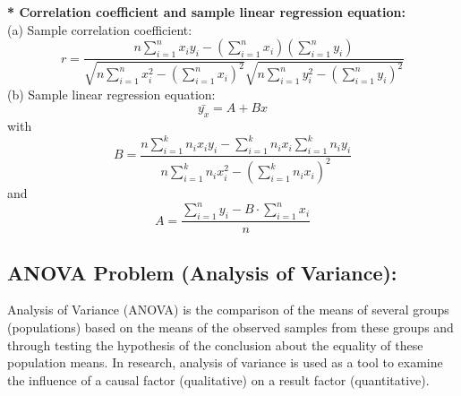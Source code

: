 \documentclass{article}
\begin{document}
	\textbf{* Correlation coefficient and sample linear regression equation:}\\
	(a) Sample correlation coefficient:
	\[
	r = \frac{n \sum_{i=1}^{n} x_i y_i - \left(\sum_{i=1}^{n} x_i\right)\left(\sum_{i=1}^{n} y_i\right)}
	{\sqrt{n \sum_{i=1}^{n} x_i^2 - \left(\sum_{i=1}^{n} x_i\right)^2} \sqrt{n \sum_{i=1}^{n} y_i^2 - \left(\sum_{i=1}^{n} y_i\right)^2}}
	\]
	(b) Sample linear regression equation: \[
	\bar{y_x} = A + Bx
	\]
	with \[
	B = \frac{n \sum_{i=1}^{k} n_i x_i y_i - \sum_{i=1}^{k} n_i x_i \sum_{i=1}^{k} n_i y_i}{n \sum_{i=1}^{k} n_i x_i^2 - \left( \sum_{i=1}^{k} n_i x_i \right)^2}
	\]
	and \[
	A = \frac{\sum_{i=1}^{n} y_i - B \cdot \sum_{i=1}^{n} x_i}{n}
	\]
	\subsection{ANOVA Problem (Analysis of Variance):}
	Analysis of Variance (ANOVA) is the comparison of the means of several groups (populations) based on the means of the observed samples from these groups and through testing the hypothesis of the conclusion about the equality of these population means. In research, analysis of variance is used as a tool to examine the influence of a causal factor (qualitative) on a result factor (quantitative).
\end{document}
